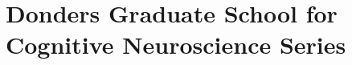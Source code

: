 \clearpage
\pagestyle{empty}

\chapter*{Donders Graduate School for Cognitive Neuroscience Series}
{}%

\npar\npar
\footnotesize
\noindent

\newcommand{\dientry}[8]{%
\noindent #1. #2 (#3). \href{http://dx.doi.org/#8}{\emph{#4}} #5, #6, #7\npar%
}



